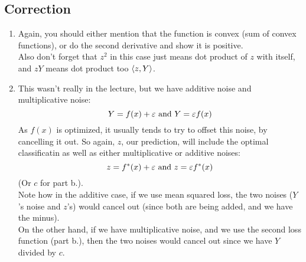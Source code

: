\documentclass[12pt]{article}
\begin{document}
\begingroup
\color{red}
\subsection*{Correction}
\begin{enumerate}[label=\alph*)]
    \item
    Again, you should either mention that
    the function is convex
    (sum of convex functions),
    or do the second derivative and show it
    is positive. \\
    Also don't forget that $z^2$
    in this case just means dot product of $z$
    with itself,
    and $zY$ means dot product too $\left\langle z, Y \right\rangle$.
    \item
    This wasn't really in the lecture,
    but we have additive noise
    and multiplicative noise:
    \[ Y = f(x) + \varepsilon \text{ and } Y = \varepsilon f(x) \]
    As $f(x)$ is optimized,
    it usually tends to try to offset this noise,
    by cancelling it out.
    So again, $z$,
    our prediction, will include the optimal
    classificatin as well as either multiplicative
    or additive noises:
    \[ z = f^*(x) + \varepsilon
    \text{ and } z = \varepsilon f^*(x) \]
    (Or $c$ for part b.). \\
    Note how in the additive case,
    if we use mean squared loss, the two noises
    ($Y$'s noise and $z$'s)
    would cancel out (since both are being added,
    and we have the minus). \\
    On the other hand, if we have multiplicative
    noise, and we use the
    second loss function (part b.),
    then the two noises would cancel out 
    since we have $Y$ divided by $c$. \\

\end{enumerate}
\endgroup

\newpage
\end{document}
